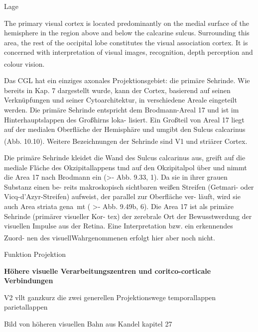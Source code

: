 \documentclass[12pt,a4paper,pdftex]{article}
\begin{document}
Lage

The primary visual cortex is located predominantly on the
medial surface of the hemisphere in the region above and
below the calcarine sulcus. Surrounding this area, the rest of
the occipital lobe constitutes the visual association cortex. It is
concerned with interpretation of visual images, recognition,
depth perception and colour vision.
\textsuperscript{\cite[15]{crossman2014neuroanatomy}}

Das CGL hat ein einziges axonales Projektionsgebiet: die primäre Sehrinde. Wie bereits
in Kap. 7 dargestellt wurde, kann der Cortex, basierend auf seinen Verknüpfungen und
seiner Cytoarchitektur, in verschiedene Areale eingeteilt werden. Die primäre Sehrinde
entspricht dem Brodmann-Areal 17 und ist im Hinterhauptslappen des Großhirns loka-
lisiert. Ein Großteil von Areal 17 liegt auf der medialen Oberfläche der Hemisphäre und
umgibt den Sulcus calcarinus (Abb. 10.10). Weitere Bezeichnungen der Sehrinde sind V1
und striärer Cortex. \textsuperscript{\cite[10]{neurowissenschaften_baer}}

Die primäre Sehrinde kleidet die Wand des Sulcus calcarinus
aus, greift auf die mediale Fläche des Okzipitallappens tmd auf
den Okzipitalpol über und nimmt die Area 17 nach Brodmann
ein (>- Abb. 9.33, 1). Da sie in ihrer grauen Substanz einen be-
reits makroskopisch sichtbaren weißen Streifen (Getmari- oder
Vicq-d'Azyr-Streifen) aufweist, der parallel zur Oberfläche ver-
läuft, wird sie auch Area striata gena~mt ( >- Abb. 9.49b, 6).
Die Area 17 ist als primäre Sehrinde (primärer visueller Kor-
tex) der zerebrale Ort der Bewusstwerdung der visuellen Impulse
aus der Retina. Eine Interpretation bzw. ein erkennendes Zuord-
nen des visuellWahrgenommenen erfolgt hier aber noch nicht.
\textsuperscript{\cite[9.8]{trepel2011neuroanatomie}}

Funktion
Projektion

\textbf{Höhere visuelle Verarbeitungszentren und coritco-corticale Verbindungen}

V2
vllt ganzkurz die zwei generellen Projektionswege
    temporallappen
    parietallappen
    
Bild von höheren visuellen Bahn aus Kandel kapitel 27
\end{document}
